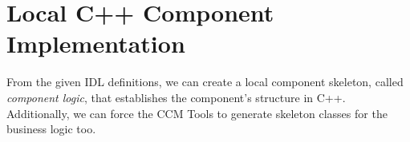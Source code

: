 \section{Local C++ Component Implementation}
\label{section:LocalC++ComponentImplementation}

From the given IDL definitions, we can create a local component skeleton, called
{\it component logic}, that establishes the component's structure in C++.
Additionally, we can force the CCM Tools to generate skeleton classes for the
business logic too.



\newpage
